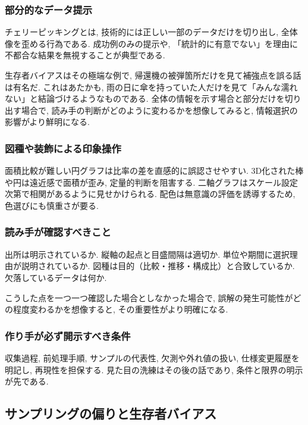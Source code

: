 \subsubsection{部分的なデータ提示}

チェリーピッキングとは, 技術的には正しい一部のデータだけを切り出し, 全体像を歪める行為である.  
成功例のみの提示や, 「統計的に有意でない」を理由に不都合な結果を無視することが典型である.  

生存者バイアスはその極端な例で, 帰還機の被弾箇所だけを見て補強点を誤る話は有名だ.  
これはあたかも, 雨の日に傘を持っていた人だけを見て「みんな濡れない」と結論づけるようなものである.  
全体の情報を示す場合と部分だけを切り出す場合で, 読み手の判断がどのように変わるかを想像してみると, 情報選択の影響がより鮮明になる.

\subsubsection{図種や装飾による印象操作}

面積比較が難しい円グラフは比率の差を直感的に誤認させやすい.  
3D化された棒や円は遠近感で面積が歪み, 定量的判断を阻害する.  
二軸グラフはスケール設定次第で相関があるように見せかけられる.  
配色は無意識の評価を誘導するため, 色選びにも慎重さが要る.

\subsubsection{読み手が確認すべきこと}

出所は明示されているか.  
縦軸の起点と目盛間隔は適切か.  
単位や期間に選択理由が説明されているか.  
図種は目的（比較・推移・構成比）と合致しているか.  
欠落しているデータは何か.  

こうした点を一つ一つ確認した場合としなかった場合で, 誤解の発生可能性がどの程度変わるかを想像すると, その重要性がより明確になる.

\subsubsection{作り手が必ず開示すべき条件}

収集過程, 前処理手順, サンプルの代表性, 欠測や外れ値の扱い, 仕様変更履歴を明記し, 再現性を担保する.  
見た目の洗練はその後の話であり, 条件と限界の明示が先である.

\subsection{サンプリングの偏りと生存者バイアス}

